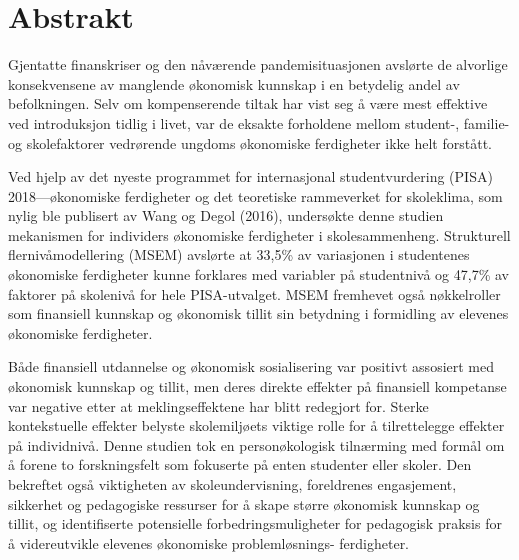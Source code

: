 \section*{Abstrakt}

\noindent Gjentatte finanskriser og den nåværende pandemisituasjonen avslørte de alvorlige konsekvensene av manglende økonomisk kunnskap i en betydelig andel av befolkningen. Selv om kompenserende tiltak har vist seg å være mest effektive ved introduksjon tidlig i livet, var de eksakte forholdene mellom student-, familie- og skolefaktorer vedrørende ungdoms økonomiske ferdigheter ikke helt forstått.

\bigskip

\noindent Ved hjelp av det nyeste programmet for internasjonal studentvurdering (PISA) 2018---økonomiske ferdigheter og det teoretiske rammeverket for skoleklima, som nylig ble publisert av Wang og Degol (2016), undersøkte denne studien mekanismen for individers økonomiske ferdigheter i skolesammenheng. Strukturell flernivåmodellering (MSEM) avslørte at 33,5\% av variasjonen i studentenes økonomiske ferdigheter kunne forklares med variabler på studentnivå og 47,7\% av faktorer på skolenivå for hele PISA-utvalget. MSEM fremhevet også nøkkelroller som finansiell kunnskap og økonomisk tillit sin betydning i formidling av elevenes økonomiske ferdigheter.

\bigskip

\noindent Både finansiell utdannelse og økonomisk sosialisering var positivt assosiert med økonomisk kunnskap og tillit, men deres direkte effekter på finansiell kompetanse var negative etter at meklingseffektene har blitt redegjort for. Sterke kontekstuelle effekter belyste skolemiljøets viktige rolle for å tilrettelegge effekter på individnivå. Denne studien tok en personøkologisk tilnærming med formål om å forene to forskningsfelt som fokuserte på enten studenter eller skoler. Den bekreftet også viktigheten av skoleundervisning, foreldrenes engasjement, sikkerhet og pedagogiske ressurser for å skape større økonomisk kunnskap og tillit, og identifiserte potensielle forbedringsmuligheter for pedagogisk praksis for å videreutvikle elevenes økonomiske problemløsnings-
ferdigheter.